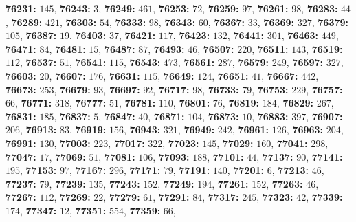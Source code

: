 \textsf{\bfseries 76231:} $145$, \textsf{\bfseries 76243:} $3$, \textsf{\bfseries 76249:} $461$, \textsf{\bfseries 76253:} $72$, \textsf{\bfseries 76259:} $97$, \textsf{\bfseries 76261:} $98$, \textsf{\bfseries 76283:} $44$, \textsf{\bfseries 76289:} $421$, \textsf{\bfseries 76303:} $54$, \textsf{\bfseries 76333:} $98$, \textsf{\bfseries 76343:} $60$, \textsf{\bfseries 76367:} $33$, \textsf{\bfseries 76369:} $327$, \textsf{\bfseries 76379:} $105$, \textsf{\bfseries 76387:} $19$, \textsf{\bfseries 76403:} $37$, \textsf{\bfseries 76421:} $117$, \textsf{\bfseries 76423:} $132$, \textsf{\bfseries 76441:} $301$, \textsf{\bfseries 76463:} $449$, \textsf{\bfseries 76471:} $84$, \textsf{\bfseries 76481:} $15$, \textsf{\bfseries 76487:} $87$, \textsf{\bfseries 76493:} $46$, \textsf{\bfseries 76507:} $220$, \textsf{\bfseries 76511:} $143$, \textsf{\bfseries 76519:} $112$, \textsf{\bfseries 76537:} $51$, \textsf{\bfseries 76541:} $115$, \textsf{\bfseries 76543:} $473$, \textsf{\bfseries 76561:} $287$, \textsf{\bfseries 76579:} $249$, \textsf{\bfseries 76597:} $327$, \textsf{\bfseries 76603:} $20$, \textsf{\bfseries 76607:} $176$, \textsf{\bfseries 76631:} $115$, \textsf{\bfseries 76649:} $124$, \textsf{\bfseries 76651:} $41$, \textsf{\bfseries 76667:} $442$, \textsf{\bfseries 76673:} $253$, \textsf{\bfseries 76679:} $93$, \textsf{\bfseries 76697:} $92$, \textsf{\bfseries 76717:} $98$, \textsf{\bfseries 76733:} $79$, \textsf{\bfseries 76753:} $229$, \textsf{\bfseries 76757:} $66$, \textsf{\bfseries 76771:} $318$, \textsf{\bfseries 76777:} $51$, \textsf{\bfseries 76781:} $110$, \textsf{\bfseries 76801:} $76$, \textsf{\bfseries 76819:} $184$, \textsf{\bfseries 76829:} $267$, \textsf{\bfseries 76831:} $185$, \textsf{\bfseries 76837:} $5$, \textsf{\bfseries 76847:} $40$, \textsf{\bfseries 76871:} $104$, \textsf{\bfseries 76873:} $10$, \textsf{\bfseries 76883:} $397$, \textsf{\bfseries 76907:} $206$, \textsf{\bfseries 76913:} $83$, \textsf{\bfseries 76919:} $156$, \textsf{\bfseries 76943:} $321$, \textsf{\bfseries 76949:} $242$, \textsf{\bfseries 76961:} $126$, \textsf{\bfseries 76963:} $204$, \textsf{\bfseries 76991:} $130$, \textsf{\bfseries 77003:} $223$, \textsf{\bfseries 77017:} $322$, \textsf{\bfseries 77023:} $145$, \textsf{\bfseries 77029:} $160$, \textsf{\bfseries 77041:} $298$, \textsf{\bfseries 77047:} $17$, \textsf{\bfseries 77069:} $51$, \textsf{\bfseries 77081:} $106$, \textsf{\bfseries 77093:} $188$, \textsf{\bfseries 77101:} $44$, \textsf{\bfseries 77137:} $90$, \textsf{\bfseries 77141:} $195$, \textsf{\bfseries 77153:} $97$, \textsf{\bfseries 77167:} $296$, \textsf{\bfseries 77171:} $79$, \textsf{\bfseries 77191:} $140$, \textsf{\bfseries 77201:} $6$, \textsf{\bfseries 77213:} $46$, \textsf{\bfseries 77237:} $79$, \textsf{\bfseries 77239:} $135$, \textsf{\bfseries 77243:} $152$, \textsf{\bfseries 77249:} $194$, \textsf{\bfseries 77261:} $152$, \textsf{\bfseries 77263:} $46$, \textsf{\bfseries 77267:} $112$, \textsf{\bfseries 77269:} $22$, \textsf{\bfseries 77279:} $61$, \textsf{\bfseries 77291:} $84$, \textsf{\bfseries 77317:} $245$, \textsf{\bfseries 77323:} $42$, \textsf{\bfseries 77339:} $174$, \textsf{\bfseries 77347:} $12$, \textsf{\bfseries 77351:} $554$, \textsf{\bfseries 77359:} $66$, 
